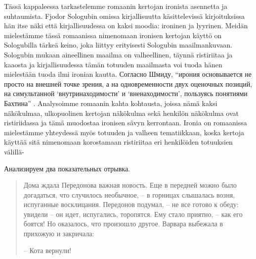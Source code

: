 \documentclass[12pt,a4paper]{article}
\begin{document}
Tässä kappaleessa tarkastelemme romaanin kertojan ironista asennetta ja suhtaumista. Fjodor Sologubin omissa kirjallisuutta käsittelevissä kirjoituksissa hän itse näki että kirjallisuudessa on kaksi moodia: ironinen ja lyyrinen. Meidän mielestämme tässä romaanissa nimenomaan ironisen kertojan käyttö on Sologubilla tärkeä keino, joka liittyy erityisesti Sologubin maailmankuvaan. Sologubin mukaan aineellinen maailma on valheellinen, täynnä ristiriitaa ja kaaosta ja kirjallisuudessa tämän totuuden maailmasta voi tuoda hänen mielestään tuoda ilmi ironian kautta. Согласно Шмиду, \enquote{ирония основывается не просто на внешней точке зрения, а на одновременности двух оценочных позиций, на симультанной \enquote{внутринаходимости} и \enquote{вненаходимости}, пользуясь понятиями Бахтина} \parencite[118]{schmid2008}. Analysoimme romaanin kahta kohtausta, joissa nämä kaksi näkökulmaa, ulkopuolinen kertojan näkökulma sekä henkilön näkökulma ovat ristiriidassa ja tämä muodostaa ironisen sävyn kerrontaan. Ironia on romaanissa mielestämme yhteydessä myös totuuden ja valheen tematiikkaan, koska kertoja käyttää sitä nimenomaan korostamaan ristiriitaa eri henkilöiden totuuksien välillä-  



Анализируем два показательных отрывка.

\begin{quote}
Дома ждала Передонова важная новость. Еще в передней можно
было догадаться, что случилось необычное, – в горницах слышалась
возня, испуганные восклицания. Передонов подумал, – не все
готово к обеду: увидели – он идет, испугались, торопятся. Ему стало
приятно, – как его боятся! Но оказалось, что произошло другое.
Варвара выбежала в прихожую и закричала:

– Кота вернули!

\parencite[171.]{sologub2004}

\end{quote}
\end{document}
